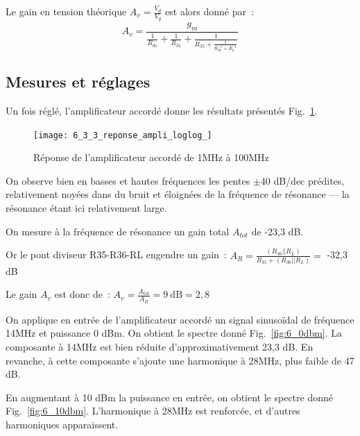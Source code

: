 \documentclass{article}
\begin{document}
Le gain en tension théorique $A_v=\frac{V_d}{V_g}$ est alors donné par~:
\begin{equation*}
A_v = \frac{g_m}{\frac{1}{R_{ds}}+\frac{1}{R_{31}}+\frac{1}{R_{35}+\frac{1}{R_{36}^{-1}+R_{L}^{-1}}}}
\end{equation*}


\subsection{Mesures et réglages}


Un fois réglé, l'amplificateur accordé donne les résultats présentés Fig.~\ref{fig:6loglog}.

\begin{figure}[h]
	\centering
	\texttt{[image: 6\_3\_3\_reponse\_ampli\_loglog\_]}
	\caption{Réponse de l'amplificateur accordé de 1MHz à 100MHz}
	\label{fig:6loglog}
\end{figure}

On observe bien en basses et hautes fréquences les pentes $\pm$40 dB/dec prédites, relativement noyées dans du bruit et éloignées de la fréquence de résonance --- la résonance étant ici relativement large.




On mesure à la fréquence de résonance un gain total $A_{tot}$ de -23,3 dB.

Or le pont diviseur R35-R36-RL engendre un gain~: $A_R = \frac{(R_{36}||R_L)}{R_{35}+(R_{36}||R_L)} = $ -32,3 dB

Le gain $A_v$ est donc de~: $A_v = \frac{A_{tot}}{A_R} = 9~\mathrm{dB} = 2,8$


On applique en entrée de l'amplificateur accordé un signal sinusoïdal de fréquence 14MHz et puissance 0 dBm. On obtient le spectre donné Fig.~\ref{fig:6_0dbm}. La composante à 14MHz est bien réduite d'approximativement 23,3 dB. En revanche, à cette composante s'ajoute une harmonique à 28MHz, plus faible de 47 dB.

En augmentant à 10 dBm la puissance en entrée, on obtient le spectre donné Fig.~\ref{fig:6_10dbm}. L'harmonique à 28MHz est renforcée, et d'autres harmoniques apparaissent.
\end{document}
